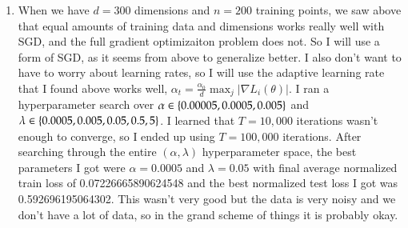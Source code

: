 \documentclass[12pt]{article}
\theoremstyle{definitionstyle}
\newcommand{\SET}[1]{\Set{\mskip-\medmuskip #1 \mskip-\medmuskip}}
\begin{document}
\begin{enumerate}[leftmargin=\labelsep]
        \item When we have $d = 300$ dimensions and $n = 200$ training points, we saw above that equal amounts of training data and dimensions works really well with SGD, and the full gradient optimizaiton problem does not. So I will use a form of SGD, as it seems from above to generalize better. I also don't want to have to worry about learning rates, so I will use the adaptive learning rate that I found above works well, $\alpha_t = \frac{\alpha_0}{d} \max_{j} |\nabla L_i(\theta)|$. I ran a hyperparameter search over $\alpha \in \SET{0.00005, 0.0005, 0.005}$ and $\lambda \in \SET{0.0005, 0.005, 0.05, 0.5, 5}$. I learned that $T = 10,000$ iterations wasn't enough to converge, so I ended up using $T = 100,000$ iterations. After searching through the entire $(\alpha, \lambda)$ hyperparameter space, the best parameters I got were $\alpha = 0.0005$ and $\lambda = 0.05$ with final average normalized train loss of 0.07226665890624548 and the best normalized test loss I got was 0.592696195064302. This wasn't very good but the data is very noisy and we don't have a lot of data, so in the grand scheme of things it is probably okay.
    \end{enumerate}
\end{document}
